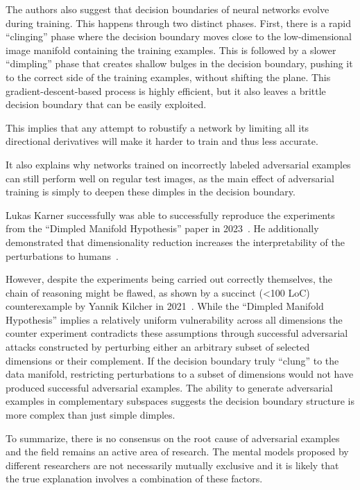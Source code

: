 \documentclass[a4paper, oneside]{discothesis}
\begin{document}
The authors also suggest that decision boundaries of neural networks evolve during training. This happens through two distinct phases. First, there is a rapid ``clinging'' phase where the decision boundary moves close to the low-dimensional image manifold containing the training examples. This is followed by a slower ``dimpling'' phase that creates shallow bulges in the decision boundary, pushing it to the correct side of the training examples, without shifting the plane. This gradient-descent-based process is highly efficient, but it also leaves a brittle decision boundary that can be easily exploited.

This implies that any attempt to robustify a network by limiting all its directional derivatives will make it harder to train and thus less accurate.

It also explains why networks trained on incorrectly labeled adversarial examples can still perform well on regular test images, as the main effect of adversarial training is simply to deepen these dimples in the decision boundary.

Lukas Karner successfully was able to successfully reproduce the experiments from the ``Dimpled Manifold Hypothesis'' paper in 2023~\cite{karner2023dimpled}. He additionally demonstrated that dimensionality reduction increases the interpretability of the perturbations to humans~\cite{karner2023dimpled}.

However, despite the experiments being carried out correctly themselves, the chain of reasoning might be flawed, as shown by a succinct (<100 LoC) counterexample by Yannik Kilcher in 2021~\cite{kilcher2021dimpledcode, kilcher2021dimpled}. While the ``Dimpled Manifold Hypothesis'' implies a relatively uniform vulnerability across all dimensions the counter experiment contradicts these assumptions through successful adversarial attacks constructed by perturbing either an arbitrary subset of selected dimensions or their complement. If the decision boundary truly ``clung'' to the data manifold, restricting perturbations to a subset of dimensions would not have produced successful adversarial examples. The ability to generate adversarial examples in complementary subspaces suggests the decision boundary structure is more complex than just simple dimples.

To summarize, there is no consensus on the root cause of adversarial examples and the field remains an active area of research. The mental models proposed by different researchers are not necessarily mutually exclusive and it is likely that the true explanation involves a combination of these factors.
\end{document}
